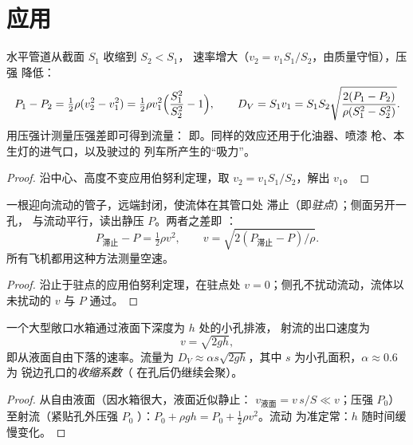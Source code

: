 \section{应用}

\begin{proposition}[文丘里流量计]\label{prop:b2:euler-bernoulli:venturi}
水平管道从截面 $S_1$ 收缩到 $S_2 < S_1$，
速率增大（$v_2 = v_1S_1/S_2$，由质量守恒），压强
降低：
\[
P_1 - P_2 = \tfrac12\rho(v_2^2 - v_1^2) = \tfrac12\rho v_1^2\Bigl(\frac{S_1^2}{S_2^2} - 1\Bigr) ,
\qquad
D_V = S_1v_1 = S_1S_2\sqrt{\frac{2(P_1 - P_2)}{\rho(S_1^2 - S_2^2)}} .
\]
用压强计测量压强差即可得到流量：
即\emph{}。同样的效应还用于化油器、喷漆
枪、本生灯的进气口，以及驶过的
列车所产生的“吸力”。
\end{proposition}

\begin{proof}
沿中心、高度不变应用伯努利定理，取 $v_2 =
v_1S_1/S_2$，解出 $v_1$。
\end{proof}

\begin{proposition}[皮托管]\label{prop:b2:euler-bernoulli:pitot}
一根迎向流动的管子，远端封闭，使流体在其管口处
滞止（即\emph{驻点}）；侧面另开一孔，
与流动平行，读出静压 $P$。两者之差即
：
\[
P_{\text{滞止}} - P = \tfrac12\rho v^2 , \qquad v = \sqrt{2(P_{\text{滞止}} - P)/\rho} .
\]
所有飞机都用这种方法测量空速。
\end{proposition}

\begin{proof}
沿止于驻点的应用伯努利定理，在驻点处
$v = 0$；侧孔不扰动流动，流体以未扰动的
$v$ 与 $P$ 通过。
\end{proof}

\begin{proposition}[托里拆利公式]\label{prop:b2:euler-bernoulli:torricelli}
一个大型敞口水箱通过液面下深度为 $h$ 处的小孔排液，
射流的出口速度为
\[
v = \sqrt{2gh} ,
\]
即从液面自由下落的速率。流量为 $D_V \approx
\alpha s\sqrt{2gh}$，其中 $s$ 为小孔面积，$\alpha \approx 0.6$ 为
锐边孔口的\emph{收缩系数}（
在孔后仍继续会聚）。
\end{proposition}

\begin{proof}
从自由液面（因水箱很大，液面近似静止：
$v_{\text{液面}} = v\,s/S \ll v$；压强 $P_0$）至射流（紧贴孔外压强 $P_0$
）：$P_0 + \rho gh = P_0 + \tfrac12\rho v^2$。流动
为准定常：$h$ 随时间缓慢变化。
\end{proof}

